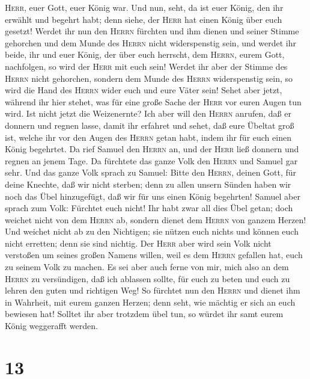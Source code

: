 \textsc{Herr}, euer Gott, euer König war.  Und nun, seht,
da ist euer König, den ihr erwählt und begehrt habt; denn siehe, der
\textsc{Herr} hat einen König über euch gesetzt!  Werdet
ihr nun den \textsc{Herrn} fürchten und ihm dienen und seiner Stimme
gehorchen und dem Munde des \textsc{Herrn} nicht widerspenstig sein, und
werdet ihr beide, ihr und euer König, der über euch herrscht, dem
\textsc{Herrn}, eurem Gott, nachfolgen, so wird der \textsc{Herr} mit
euch sein!  Werdet ihr aber der Stimme des \textsc{Herrn}
nicht gehorchen, sondern dem Munde des \textsc{Herrn} widerspenstig
sein, so wird die Hand des \textsc{Herrn} wider euch und eure Väter
sein!  Sehet aber jetzt, während ihr hier stehet, was für
eine große Sache der \textsc{Herr} vor euren Augen tun wird.
 Ist nicht jetzt die Weizenernte? Ich aber will den
\textsc{Herrn} anrufen, daß er donnern und regnen lasse, damit ihr
erfahret und sehet, daß eure Übeltat groß ist, welche ihr vor den Augen
des \textsc{Herrn} getan habt, indem ihr für euch einen König begehrtet.
 Da rief Samuel den \textsc{Herrn} an, und der
\textsc{Herr} ließ donnern und regnen an jenem Tage. Da fürchtete das
ganze Volk den \textsc{Herrn} und Samuel gar sehr.  Und
das ganze Volk sprach zu Samuel: Bitte den \textsc{Herrn}, deinen Gott,
für deine Knechte, daß wir nicht sterben; denn zu allen unsern Sünden
haben wir noch das Übel hinzugefügt, daß wir für uns einen König
begehrten!  Samuel aber sprach zum Volk: Fürchtet euch
nicht! Ihr habt zwar all dies Übel getan; doch weichet nicht von dem
\textsc{Herrn} ab, sondern dienet dem \textsc{Herrn} von ganzem Herzen!
 Und weichet nicht ab zu den Nichtigen; sie nützen euch
nichts und können euch nicht erretten; denn sie sind nichtig.
 Der \textsc{Herr} aber wird sein Volk nicht verstoßen um
seines großen Namens willen, weil es dem \textsc{Herrn} gefallen hat,
euch zu seinem Volk zu machen.  Es sei aber auch ferne
von mir, mich also an dem \textsc{Herrn} zu versündigen, daß ich
ablassen sollte, für euch zu beten und euch zu lehren den guten und
richtigen Weg!  So fürchtet nun den \textsc{Herrn} und
dienet ihm in Wahrheit, mit eurem ganzen Herzen; denn seht, wie mächtig
er sich an euch bewiesen hat!  Solltet ihr aber trotzdem
übel tun, so würdet ihr samt eurem König weggerafft werden.

\hypertarget{section-12}{%
\section{13}\label{section-12}}

